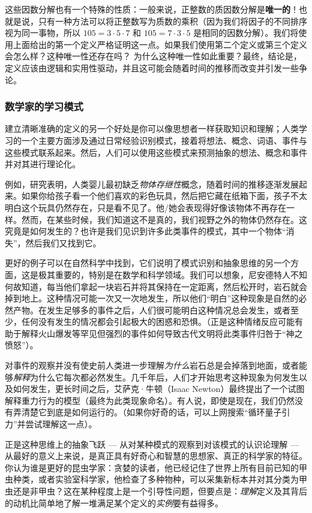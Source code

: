 这些因数分解也有一个特殊的性质：一般来说，正整数的质因数分解是\textbf{唯一的}！也就是说，只有一种方法可以将正整数写为质数的乘积（因为我们将因子的不同排序视为同一事物，所以 $105 = 3 \cdot 5 \cdot 7$ 和 $105 = 7 \cdot 3 \cdot 5$ 是相同的因数分解）。我们将使用上面给出的第一个定义严格证明这一点。如果我们使用第二个定义或第三个定义会怎么样？这种唯一性还存在吗？ 为什么这种唯一性如此重要？最终，结论是，定义应该由逻辑和实用性驱动，并且这可能会随着时间的推移而改变并引发一些争论。

\subsubsection*{数学家的学习模式}

建立清晰准确的定义的另一个好处是你可以像思想者一样获取知识和理解；人类学习的一个主要方面涉及通过日常经验识别模式，接着将想法、概念、词语、事件与这些模式联系起来。然后，人们可以使用这些模式来预测抽象的想法、概念和事件并对其进行理论化。

例如，研究表明，人类婴儿最初缺乏\textit{物体存继性}概念，随着时间的推移逐渐发展起来。如果你给孩子看一个他们喜欢的彩色玩具，然后把它藏在纸箱下面，孩子不太明白这个玩具仍然存在，只是看不见了。他/她会表现得好像该物体不再存在一样。然而，在某些时候，我们知道这不是真的，我们视野之外的物体仍然存在。这究竟是如何发生的？也许是我们见识到许多此类事件的模式，其中一个物体“消失”，然后我们又找到它。

更好的例子可以在自然科学中找到，它们说明了模式识别和抽象思维的另一个方面，这是极其重要的，特别是在数学和科学领域。我们可以想象，尼安德特人不知何故知道，每当他们拿起一块岩石并将其保持在一定距离，然后松开时，岩石就会掉到地上。这种情况可能一次又一次地发生，所以他们“明白”这种现象是自然的必然产物。在发生足够多的事件之后，人们很可能明白这种情况总会发生，或者至少，任何没有发生的情况都会引起极大的困惑和恐惧。（正是这种情绪反应可能有助于解释火山爆发等罕见但强烈的事件如何导致古代文明将此类事件归咎于“神之愤怒”）。

对事件的观察并没有使史前人类进一步理解\textit{为什么}岩石总是会掉落到地面，或者能够\textit{解释}为什么它每次都必然发生。几千年后，人们才开始思考这种现象为何发生以及如何发生，更长时间之后，艾萨克·牛顿（Isaac Newton）最终提出了一个试图解释重力行为的模型（最终为此类现象命名）。有人说，即使是现在，我们仍然没有弄清楚它到底是如何运行的。（如果你好奇的话，可以上网搜索“循环量子引力”并尝试理解这一点）。

正是这种思维上的抽象飞跃 --- 从对某种模式的观察到对该模式的认识论理解 --- 从最好的意义上来说，是真正具有好奇心和智慧的思想家、真正的科学家的特征。你认为谁是更好的昆虫学家：贪婪的读者，他已经记住了世界上所有目前已知的甲虫种类，或者实验室科学家，他检查了多种物种，可以采集新标本并对其分类为甲虫还是非甲虫？这在某种程度上是一个引导性问题，但要点是：\textit{理解}定义及其背后的动机比简单地了解一堆满足某个定义的\textit{实例}要有益得多。

